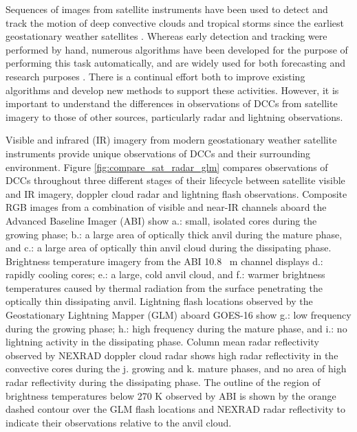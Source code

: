 Sequences of images from satellite instruments have been used to detect and track the motion of deep convective clouds and tropical storms since the earliest geostationary weather satellites \citep{menzel_cloud_2001}.
Whereas early detection and tracking were performed by hand, numerous algorithms have been developed for the purpose of performing this task automatically, and are widely used for both forecasting and research purposes \citep[e.g.][]{mecikalski_use_2011, senf_characterization_2015, senf_satellite-based_2017, feng_life_2012, feng_spatiotemporal_2019, zinner_cb-tram:_2008}.
There is a continual effort both to improve existing algorithms and develop new methods to support these activities.
However, it is important to understand the differences in observations of DCCs from satellite imagery to those of other sources, particularly radar and lightning observations.

Visible and infrared (IR) imagery from modern geostationary weather satellite instruments provide unique observations of DCCs and their surrounding environment.
Figure \ref{fig:compare_sat_radar_glm} compares observations of DCCs throughout three different stages of their lifecycle between satellite visible and IR imagery, doppler cloud radar and lightning flash observations.
Composite RGB images from a combination of visible and near-IR channels aboard the Advanced Baseline Imager (ABI) show a.: small, isolated cores during the growing phase; b.: a large area of optically thick anvil during the mature phase, and c.: a large area of optically thin anvil cloud during the dissipating phase.
Brightness temperature imagery from the ABI 10.8 \unit{\mu m} channel displays d.: rapidly cooling cores; e.: a large, cold anvil cloud, and f.: warmer brightness temperatures caused by thermal radiation from the surface penetrating the optically thin dissipating anvil. 
Lightning flash locations observed by the Geostationary Lightning Mapper (GLM) aboard GOES-16 show g.: low frequency during the growing phase; h.: high frequency during the mature phase, and i.: no lightning activity in the dissipating phase. 
Column mean radar reflectivity observed by NEXRAD doppler cloud radar shows high radar reflectivity in the convective cores during the j. growing and k. mature phases, and no area of high radar reflectivity during the dissipating phase. 
The outline of the region of brightness temperatures below 270 \unit{K} observed by ABI is shown by the orange dashed contour over the GLM flash locations and NEXRAD radar reflectivity to indicate their observations relative to the anvil cloud.

